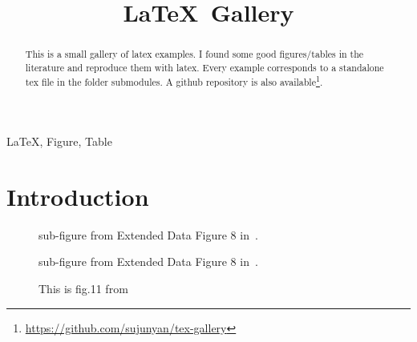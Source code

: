 \documentclass[conference]{IEEEtran}
\title{\LaTeX\, Gallery}
\author{
    \IEEEauthorblockN{Junyan Su}
    \IEEEauthorblockA{junyan.su@my.cityu.edu.hk}
}
\begin{document}
\maketitle

\begin{abstract}
    This is a small gallery of latex examples. I found some good figures/tables in the literature and reproduce them with latex. Every example corresponds to a standalone tex file in the folder submodules. A github repository is also available\footnote{\url{https://github.com/sujunyan/tex-gallery}}.
\end{abstract}


\begin{IEEEkeywords}
    \LaTeX , Figure, Table
\end{IEEEkeywords}

\section{Introduction}
\lipsum
\begin{figure}[tb]
      \centering
      
    \caption{sub-figure from Extended Data Figure 8 in~\cite{2}.}
\end{figure}

\lipsum[1]
\begin{figure}[tb]
  \centering
  
  \caption{sub-figure from Extended Data Figure 8 in~\cite{2}.}
\end{figure}

\lipsum
\lipsum[1]
\begin{figure}[htb]
    \begin{center}
        
    \end{center} 
    \caption{This is fig.11 from~\cite{1}}
\end{figure}
\end{document}
